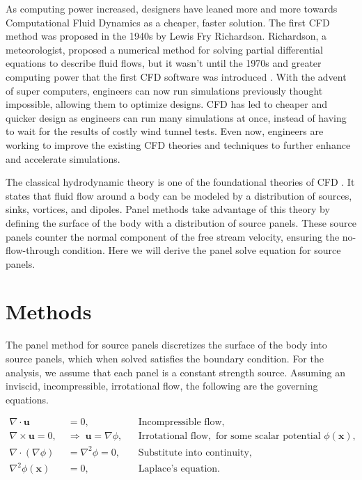 \documentclass[conf]{new-aiaa} %
\begin{document}
As computing power increased, designers have leaned more and more towards Computational Fluid Dynamics as a cheaper, faster solution.
The first CFD method was proposed in the 1940s by Lewis Fry Richardson. 
Richardson, a meteorologist, proposed a numerical method for solving partial differential equations to describe fluid flows, but it wasn't until the 1970s and greater computing power that the first CFD software was introduced \cite{resolved_cfd_history}.
With the advent of super computers, engineers can now run simulations previously thought impossible, allowing them to optimize designs.
CFD has led to cheaper and quicker design as engineers can run many simulations at once, instead of having to wait for the results of costly wind tunnel tests.
Even now, engineers are working to improve the existing CFD theories and techniques to further enhance and accelerate simulations.

The classical hydrodynamic theory is one of the foundational theories of CFD \cite{sciencedirect_vortex}. 
It states that fluid flow around a body can be modeled by a distribution of sources, sinks, vortices, and dipoles.
Panel methods take advantage of this theory by defining the surface of the body with a distribution of source panels.
These source panels counter the normal component of the free stream velocity, ensuring the no-flow-through condition.
Here we will derive the panel solve equation for source panels.

\section{Methods}
The panel method for source panels discretizes the surface of the body into source panels, which when solved satisfies the boundary condition.
For the analysis, we assume that each panel is a constant strength source.
Assuming an inviscid, incompressible, irrotational flow, the following are the governing equations.

\begin{align}
\nabla \cdot \mathbf{u} &= 0, 
&& \text{Incompressible flow}, \\
\nabla \times \mathbf{u} = 0, \; &\Rightarrow \; \mathbf{u} = \nabla \phi,
&& \text{Irrotational flow}, \text{ for some scalar potential $\phi(\mathbf{x})$}, \\
\nabla \cdot (\nabla \phi) &= \nabla^2 \phi = 0, 
&& \text{Substitute into continuity,} \\
\nabla^2 \phi(\mathbf{x}) &= 0, 
&& \text{Laplace's equation}.
\label{eq:basics}
\end{align}
\end{document}
